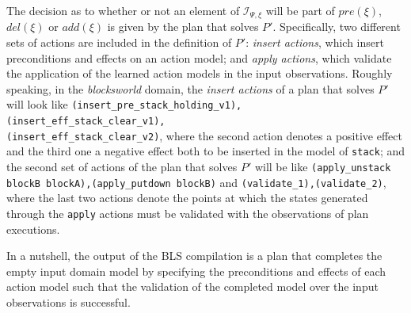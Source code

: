 \documentclass{article}
\begin{document}
The decision as to whether or not an element of ${\mathcal I}_{\Psi,\xi}$ will be part of $pre(\xi)$, $del(\xi)$ or $add(\xi)$ is given by the plan that solves $P'$. Specifically, two different sets of actions are included in the definition of $P'$: \emph{insert actions}, which insert preconditions and effects on an action model; and \emph{apply actions}, which validate the application of the learned action models in the input observations. Roughly speaking, in the \emph{blocksworld} domain, the \emph{insert actions} of a plan that solves $P'$ will look like {\tt{\footnotesize (insert\_pre\_stack\_holding\_v1),\\
(insert\_eff\_stack\_clear\_v1),\\
(insert\_eff\_stack\_clear\_v2)}}, where the second action denotes a positive effect and the third one a negative effect both to be inserted in the model of {\tt{\small stack}}; and the second set of actions of the plan that solves $P'$ will be like {\tt{\small (apply\_unstack blockB blockA),(apply\_putdown blockB)}} and {\tt{\small (validate\_1),(validate\_2)}}, where the last two actions denote the points at which the states generated through the {\tt {\small apply}} actions must be validated with the observations of plan executions.

In a nutshell, the output of the BLS compilation is a plan that completes the empty input domain model by specifying the preconditions and effects of each action model such that the validation of the completed model over the input observations is successful.




\end{document}
